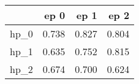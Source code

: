 \begin{tabular}{lrrr}
\toprule
{} &   ep 0 &   ep 1 &   ep 2 \\
\midrule
hp\_0 &  0.738 &  0.827 &  0.804 \\
hp\_1 &  0.635 &  0.752 &  0.815 \\
hp\_2 &  0.674 &  0.700 &  0.624 \\
\bottomrule
\end{tabular}
